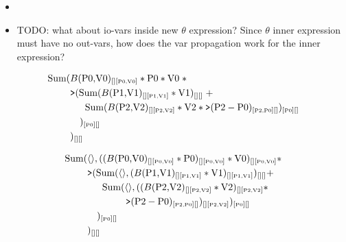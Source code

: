\begin{itemize}
  \item {}  
\end{itemize}



\begin{itemize}
  \item TODO: what about io-vars inside new $\theta$ expression? Since
  $\theta$ inner expression must have no out-vars, how does the var propagation
  work for the inner expression?
\end{itemize}


\begin{align*}
\calcsum( & B(\v{P0,V0})_{[][\vv{P0,V0}]} * \v{P0} * \v{V0} \; *
\\
& \calcgt(\calcsum(B(\v{P1,V1})_{[][\vv{P1,V1}]} * \v{V1})_{[][]} \; +
\\
& \quad \;\; \calcsum(B(\v{P2,V2})_{[][\vv{P2,V2}]} * \v{V2} *
                 \calcgt(\v{P2}-\v{P0})_{[\vv{P2,P0}][]})_{[\vv{P0}][]}
\\
& \quad )_{[\vv{P0}][]}
\\
& )_{[][]}
\end{align*}

\begin{align*}
\calcsum( & \tuple{},
    ((B(\v{P0,V0})_{[][\vv{P0,V0}]}
      * \v{P0})_{[][\vv{P0,V0}]}
      * \v{V0})_{[][\vv{P0,V0}]} *
\\
& \calcgt(\calcsum(\tuple{},
    (B(\v{P1,V1})_{[][\vv{P1,V1}]}
     * \v{V1})_{[][\vv{P1,V1}]})_{[][]} +
\\
& \quad \;\; \calcsum(\tuple{},
    ((B(\v{P2,V2})_{[][\vv{P2,V2}]} * \v{V2})_{[][\vv{P2,V2}]} *
\\
& \qquad \qquad
    \calcgt(\v{P2}-\v{P0})_{[\vv{P2,P0}][]})_{[][\vv{P2,V2}]})_{[\vv{P0}][]}
\\
& \quad )_{[\vv{P0}][]}
\\
& )_{[][]}
\end{align*}

